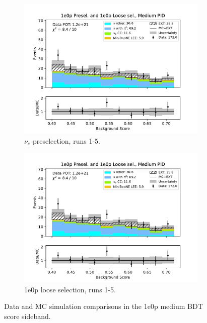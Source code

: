\begin{figure}[H]
\begin{subfigure}{0.5\linewidth}
        \includegraphics[width=\linewidth]{technote/Sidebands/Figures/NearSideband/near_sideband_bkg_score_run1234a4b4c4d5_ZP_ZPLOOSESEL_MEDIUM_PID.pdf}
        \caption{$\nu_e$ preselection, runs 1-5.}
    \end{subfigure}%
    \begin{subfigure}{0.5\linewidth}
        \includegraphics[width=\linewidth]{technote/Sidebands/Figures/NearSideband/near_sideband_bkg_score_run1234a4b4c4d5_ZP_ZPLOOSESEL_MEDIUM_PID.pdf}
        \caption{1e0p loose selection, runs 1-5.}
    \end{subfigure}
    \caption{Data and MC simulation comparisons in the 1e0p medium BDT score sideband.}
\end{figure}